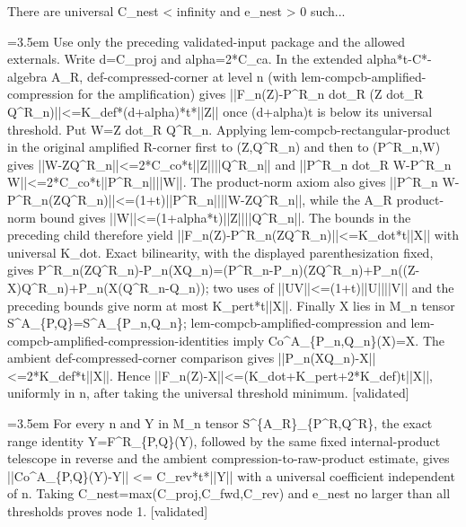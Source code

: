 \documentclass{article}
\newcommand{\step}[1]{\par\noindent\hangindent=3.5em\hangafter=1%
  \makebox[3.5em][l]{\textbf{#1.}}}
\newcommand{\steptag}[1]{\hfill{\small\textsf{[#1]}}}
\begin{document}
\begin{proofbox}{There are universal C\_nest < infinity and e\_nest > 0 such...}
\step{1.3.2.2} Use only the preceding validated-input package and the allowed externals. Write d=C\_proj and alpha=2*C\_ca. In the extended alpha*t-C*-algebra A\_R, def-compressed-corner at level n (with lem-compcb-amplified-compression for the amplification) gives ||F\_n(Z)-P\textasciicircum{}R\_n dot\_R (Z dot\_R Q\textasciicircum{}R\_n)||<=K\_def*(d+alpha)*t*||Z|| once (d+alpha)t is below its universal threshold. Put W=Z dot\_R Q\textasciicircum{}R\_n. Applying lem-compcb-rectangular-product in the original amplified R-corner first to (Z,Q\textasciicircum{}R\_n) and then to (P\textasciicircum{}R\_n,W) gives ||W-ZQ\textasciicircum{}R\_n||<=2*C\_co*t||Z||||Q\textasciicircum{}R\_n|| and ||P\textasciicircum{}R\_n dot\_R W-P\textasciicircum{}R\_n W||<=2*C\_co*t||P\textasciicircum{}R\_n||||W||. The product-norm axiom also gives ||P\textasciicircum{}R\_n W-P\textasciicircum{}R\_n(ZQ\textasciicircum{}R\_n)||<=(1+t)||P\textasciicircum{}R\_n||||W-ZQ\textasciicircum{}R\_n||, while the A\_R product-norm bound gives ||W||<=(1+alpha*t)||Z||||Q\textasciicircum{}R\_n||. The bounds in the preceding child therefore yield ||F\_n(Z)-P\textasciicircum{}R\_n(ZQ\textasciicircum{}R\_n)||<=K\_dot*t||X|| with universal K\_dot. Exact bilinearity, with the displayed parenthesization fixed, gives P\textasciicircum{}R\_n(ZQ\textasciicircum{}R\_n)-P\_n(XQ\_n)=(P\textasciicircum{}R\_n-P\_n)(ZQ\textasciicircum{}R\_n)+P\_n((Z-X)Q\textasciicircum{}R\_n)+P\_n(X(Q\textasciicircum{}R\_n-Q\_n)); two uses of ||UV||<=(1+t)||U||||V|| and the preceding bounds give norm at most K\_pert*t||X||. Finally X lies in M\_n tensor S\textasciicircum{}A\_\{P,Q\}=S\textasciicircum{}A\_\{P\_n,Q\_n\}; lem-compcb-amplified-compression and lem-compcb-amplified-compression-identities imply Co\textasciicircum{}A\_\{P\_n,Q\_n\}(X)=X. The ambient def-compressed-corner comparison gives ||P\_n(XQ\_n)-X||<=2*K\_def*t||X||. Hence ||F\_n(Z)-X||<=(K\_dot+K\_pert+2*K\_def)t||X||, uniformly in n, after taking the universal threshold minimum. \steptag{validated} \\[4pt]
\step{1.4} For every n and Y in M\_n tensor S\textasciicircum{}\{A\_R\}\_\{P\textasciicircum{}R,Q\textasciicircum{}R\}, the exact range identity Y=F\textasciicircum{}R\_\{P,Q\}(Y), followed by the same fixed internal-product telescope in reverse and the ambient compression-to-raw-product estimate, gives ||Co\textasciicircum{}A\_\{P,Q\}(Y)-Y|| <= C\_rev*t*||Y|| with a universal coefficient independent of n. Taking C\_nest=max(C\_proj,C\_fwd,C\_rev) and e\_nest no larger than all thresholds proves node 1. \steptag{validated} \\[6pt]

\end{proofbox}
\end{document}
